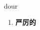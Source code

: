 
\begin{frame}
{\huge dour}
\begin{center}
\begin{enumerate}\Large
  \item \textbf{严厉的}
\end{enumerate}
\end{center}
\end{frame}
